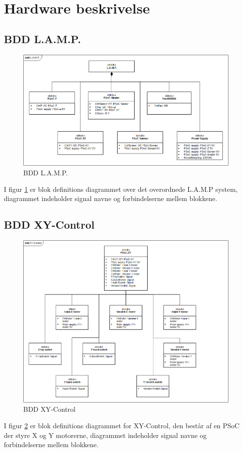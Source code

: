 \section{Hardware beskrivelse}

\subsection{BDD L.A.M.P.}
\begin{figure}[H] \centering
    \includegraphics[width=\textwidth]{0_Filer/Figuer/5_HW_Design/bddLAMPvers3.png}
    \caption{BDD L.A.M.P.}
    \label{fig:bddLAMP}
\end{figure}
I figur \ref{fig:bddLAMP} er blok definitions diagrammet over det overordnede L.A.M.P system, diagrammet indeholder signal navne og forbindelserne mellem blokkene.

\subsection{BDD XY-Control}
\begin{figure}[H] \centering
    \includegraphics[width=\textwidth]{0_Filer/Figuer/5_HW_Design/bddPSoC1vers2.png}
    \caption{BDD XY-Control}
    \label{fig:bddXY}
\end{figure}
I figur \ref{fig:bddXY} er blok definitions diagrammet for XY-Control, den består af en PSoC der styre X og Y motorerne, diagrammet indeholder signal navne og forbindelserne mellem blokkene.

